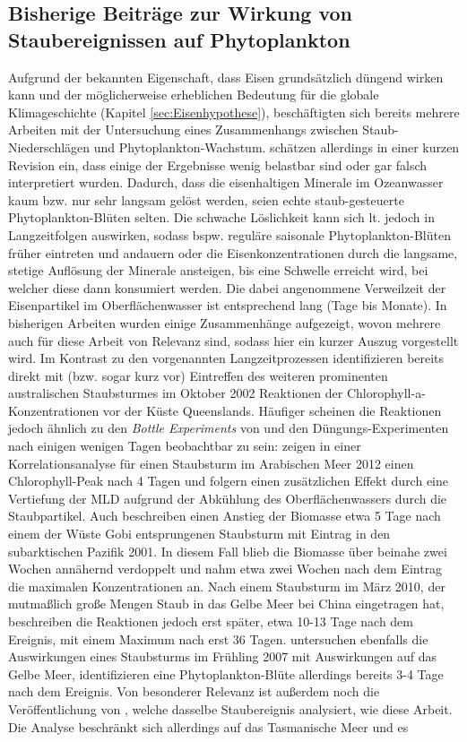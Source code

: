\documentclass[12pt,a4paper,onecolumn]{scrartcl}
\begin{document}
\subsection{Bisherige Beiträge zur Wirkung von Staubereignissen auf Phytoplankton}
Aufgrund der bekannten Eigenschaft, dass Eisen grundsätzlich düngend wirken kann und der möglicherweise erheblichen Bedeutung für die globale Klimageschichte (Kapitel \ref{sec:Eisenhypothese}), beschäftigten sich bereits mehrere Arbeiten mit der Untersuchung eines Zusammenhangs zwischen Staub-Niederschlägen und Phytoplankton-Wachstum. \citet{Boyd.2010} schätzen allerdings in einer kurzen Revision ein, dass einige der Ergebnisse wenig belastbar sind oder gar falsch interpretiert wurden. Dadurch, dass die eisenhaltigen Minerale im Ozeanwasser kaum bzw. nur sehr langsam gelöst werden, seien echte staub-gesteuerte Phytoplankton-Blüten selten. Die schwache Löslichkeit kann sich lt. \citet{Boyd.2010} jedoch in Langzeitfolgen auswirken, sodass bspw. reguläre saisonale Phytoplankton-Blüten früher eintreten und andauern oder die Eisenkonzentrationen durch die langsame, stetige Auflösung der Minerale ansteigen, bis eine Schwelle erreicht wird, bei welcher diese dann konsumiert werden. Die dabei angenommene Verweilzeit der Eisenpartikel im Oberflächenwasser ist entsprechend lang (Tage bis Monate). In bisherigen Arbeiten wurden einige Zusammenhänge aufgezeigt, wovon mehrere auch für diese Arbeit von Relevanz sind, sodass hier ein kurzer Auszug vorgestellt wird. Im Kontrast zu den vorgenannten Langzeitprozessen identifizieren \citet{Shaw.2008} bereits direkt mit (bzw. sogar kurz vor) Eintreffen des weiteren prominenten australischen Staubsturmes im Oktober 2002 Reaktionen der Chlorophyll-a-Konzentrationen vor der Küste Queenslands. Häufiger scheinen die Reaktionen jedoch ähnlich zu den \textit{Bottle Experiments} von \citet{Martin.1988} und den Düngungs-Experimenten \citep{Trull.2001} nach einigen wenigen Tagen beobachtbar zu sein: \citet{Bali.2019} zeigen in einer Korrelationsanalyse für einen Staubsturm im Arabischen Meer 2012 einen Chlorophyll-Peak nach 4 Tagen und folgern einen zusätzlichen Effekt durch eine Vertiefung der MLD aufgrund der Abkühlung des Oberflächenwassers durch die Staubpartikel. Auch \citet{Bishop.2002} beschreiben einen Anstieg der Biomasse etwa 5 Tage nach einem der Wüste Gobi entsprungenen Staubsturm mit Eintrag in den subarktischen Pazifik 2001. In diesem Fall blieb die Biomasse über beinahe zwei Wochen annähernd verdoppelt und nahm etwa zwei Wochen nach dem Eintrag die maximalen Konzentrationen an. Nach einem Staubsturm im März 2010, der mutmaßlich große Mengen Staub in das Gelbe Meer bei China eingetragen hat, beschreiben \citet{Tan.2014} die Reaktionen jedoch erst später, etwa 10-13 Tage nach dem Ereignis, mit einem Maximum nach erst 36 Tagen. \citet{Shi.2012} untersuchen ebenfalls die Auswirkungen eines Staubsturms im Frühling 2007 mit Auswirkungen auf das Gelbe Meer, identifizieren eine Phytoplankton-Blüte allerdings bereits 3-4 Tage nach dem Ereignis. Von besonderer Relevanz ist außerdem noch die Veröffentlichung von \citet{Gabric.2016}, welche dasselbe Staubereignis analysiert, wie  diese Arbeit. Die Analyse beschränkt sich allerdings auf das Tasmanische Meer und es 
\end{document}
